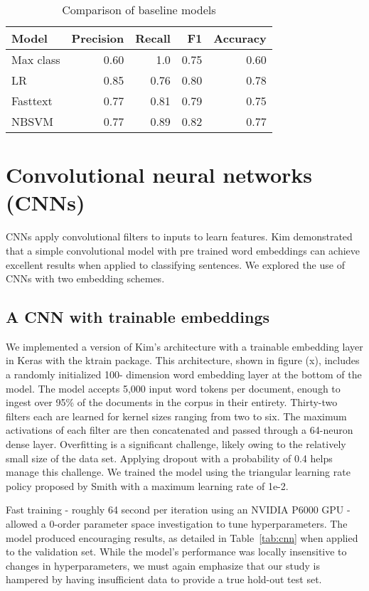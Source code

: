 \documentclass[twocolumn,10pt]{wmrDoc}
\begin{document}
\begin{table}
 \caption{Comparison of baseline models}
  \centering
  \begin{tabular}{lrrrr}
    \toprule
    Model  & Precision & Recall & F1 & Accuracy\\
    \midrule
    Max class   & 0.60 & 1.0 & 0.75  & 0.60 \\
    LR          & 0.85 & 0.76 & 0.80 & 0.78 \\
    Fasttext    & 0.77 & 0.81 & 0.79 & 0.75 \\
    NBSVM       & 0.77 & 0.89 & 0.82 & 0.77 \\
    \bottomrule
  \end{tabular}
  \label{tab:baseline}
\end{table}

\section{Convolutional neural networks (CNNs)}
CNNs apply convolutional filters to inputs to learn features.  Kim demonstrated that a simple convolutional model with pre trained word embeddings can achieve excellent results when applied to classifying sentences.  We explored the use of CNNs with two embedding schemes.

\subsection{A CNN with trainable embeddings}
We implemented a version of Kim’s architecture with a trainable embedding layer in Keras with the ktrain package.  This architecture, shown in figure (x), includes a randomly initialized 100- dimension word embedding layer at the bottom of the model.  The model accepts 5,000 input word tokens per document, enough to ingest over 95\% of the documents in the corpus in their entirety.  Thirty-two filters each are learned for kernel sizes ranging from two to six.  The maximum activations of each filter are then concatenated and passed through a 64-neuron dense layer.  Overfitting is a significant challenge, likely owing to the relatively small size of the data set.  Applying dropout with a probability of 0.4 helps manage this challenge.  We trained the model using the triangular learning rate policy proposed by Smith \cite{smith2017} with a maximum learning rate of 1e-2.

Fast training - roughly 64 second per iteration using an NVIDIA P6000 GPU - allowed a 0-order parameter space investigation to tune hyperparameters.  The model produced encouraging results, as detailed in Table~\ref{tab:cnn} when applied to the validation set.  While the model’s performance was locally insensitive to changes in hyperparameters, we must again emphasize that our study is hampered by having insufficient data to provide a true hold-out test set.
\end{document}
